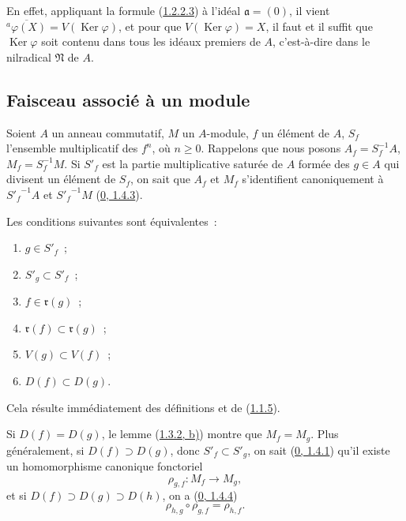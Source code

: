 En effet, appliquant la formule (\hyperref[I.1.2.2.3-fr]{1.2.2.3}) à l'idéal
$\mathfrak{a}=(0)$, il vient
$\overline{{}^a\varphi(X)}=V(\operatorname{Ker}\varphi)$, et pour que
$V(\operatorname{Ker}\varphi)=X$, il faut et il suffit que
$\operatorname{Ker}\varphi$ soit contenu dans tous les idéaux premiers de
$A$, c'est-à-dire dans le nilradical $\mathfrak{N}$ de $A$.

\subsection{Faisceau associé à un module}
\label{subsection:I.1.3-fr}
\label{I.1.3-fr}

\begin{env}[1.3.1]
\label{I.1.3.1-fr}
Soient $A$ un anneau commutatif, $M$ un $A$-module, $f$ un élément de $A$,
$S_f$ l'ensemble multiplicatif des $f^n$, où $n\geq0$. Rappelons que nous
posons $A_f=S_f^{-1}A$, $M_f=S_f^{-1}M$. Si $S'_f$ est la partie
multiplicative saturée de $A$ formée des $g\in A$ qui divisent un élément de
$S_f$, on sait que $A_f$ et $M_f$ s'identifient canoniquement à
${S'_f}^{-1}A$ et ${S'_f}^{-1}M$
(\hyperref[0.1.4.3-fr]{0, 1.4.3}).
\end{env}

\begin{lemma}[1.3.2]
\label{I.1.3.2-fr}
Les conditions suivantes sont équivalentes~:
\begin{enumerate}
  \item[\rm(a)] $g\in S'_f$~;
  \item[\rm(b)] $S'_g\subset S'_f$~;
  \item[\rm(c)] $f\in\mathfrak{r}(g)$~;
  \item[\rm(d)] $\mathfrak{r}(f)\subset\mathfrak{r}(g)$~;
  \item[\rm(e)] $V(g)\subset V(f)$~;
  \item[\rm(f)] $D(f)\subset D(g)$.
\end{enumerate}
\end{lemma}

Cela résulte immédiatement des définitions et de
(\hyperref[I.1.1.5-fr]{1.1.5}).

\begin{env}[1.3.3]
\label{I.1.3.3-fr}
Si $D(f)=D(g)$, le lemme (\hyperref[I.1.3.2-fr]{1.3.2, b)}) montre que
$M_f=M_g$. Plus généralement, si $D(f)\supset D(g)$, donc
$S'_f\subset S'_g$, on sait (\hyperref[0.1.4.1-fr]{0, 1.4.1}) qu'il existe un
homomorphisme canonique fonctoriel
\[
  \rho_{g,f}:M_f\longrightarrow M_g,
\]
et si $D(f)\supset D(g)\supset D(h)$, on a
(\hyperref[0.1.4.4-fr]{0, 1.4.4})
\begin{equation}
  \rho_{h,g}\circ\rho_{g,f}=\rho_{h,f}.
  \tag{1.3.3.1}\label{I.1.3.3.1-fr}
\end{equation}
\end{env}

